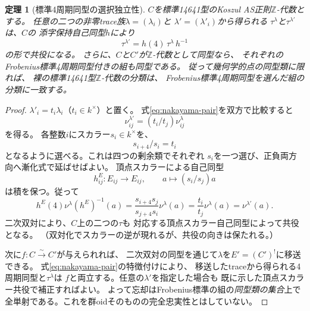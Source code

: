\documentclass[11pt,a4paper]{ltjsarticle}
\newtheorem{theorem}{定理}[section]
\theoremstyle{definition}
\begin{document}
\begin{theorem}[標準4周期同型の選択独立性]\label{thm:canonical-four}
$C$を標準14641型のKoszul AS正則$\mathbb Z$-代数とする。
任意の二つの非零trace族$\lambda=(\lambda_i)$と
$\lambda'=(\lambda'_i)$から得られる
$\tau^\lambda$と$\tau^{\lambda'}$は、$C$の
添字保持自己同型$h$により
\[
 \tau^{\lambda'}=h(4)\,\tau^\lambda\,h^{-1}
\]
の形で共役になる。
さらに、$C$と$C'$が$\mathbb Z$-代数として同型なら、
それぞれのFrobenius標準4周期同型付きの組も同型である。
従って\emph{幾何学的点の同型類}に限れば、
裸の標準14641型$\mathbb Z$-代数の分類は、
Frobenius標準4周期同型を選んだ組の分類に一致する。
\end{theorem}
\begin{proof}
$\lambda'_i=t_i\lambda_i$（$t_i\in k^\times$）と置く。
式\eqref{eq:nakayama-pair}を双方で比較すると
\begin{equation}\label{eq:trace-change}
 \nu^{\lambda'}_{ij}=(t_i/t_j)\nu^\lambda_{ij}
\end{equation}
を得る。
各整数$i$にスカラー$s_i\in k^\times$を、
\[
 s_{i+4}/s_i=t_i
\]
となるように選べる。これは四つの剰余類でそれぞれ
$s_i$を一つ選び、正負両方向へ漸化式で延ばせばよい。
頂点スカラーによる自己同型
\[
 h^E_{ij}:E_{ij}\longrightarrow E_{ij},
 \qquad a\longmapsto(s_i/s_j)a
\]
は積を保つ。従って
\[
 h^E(4)\nu^\lambda(h^E)^{-1}(a)
 =\frac{s_{i+4}s_j}{s_{j+4}s_i}\nu^\lambda(a)
 =\frac{t_i}{t_j}\nu^\lambda(a)
 =\nu^{\lambda'}(a).
\]
二次双対により、$C$上の二つの$\tau$も
対応する頂点スカラー自己同型によって共役となる。
（双対化でスカラーの逆が現れるが、共役の向きは保たれる。）

次に$f:C\xrightarrow{\sim}C'$が与えられれば、
二次双対の同型を通じて$\lambda$を$E'=(C')^!$に移送できる。
式\eqref{eq:nakayama-pair}の特徴付けにより、
移送したtraceから得られる4周期同型と$\tau^\lambda$は
$f$と両立する。任意の$\lambda'$を指定した場合も
既に示した頂点スカラー共役で補正すればよい。
よって忘却はFrobenius標準の組の\emph{同型類の集合}上で
全単射である。これを群oidそのものの完全忠実性とはしていない。
\end{proof}
\end{document}
